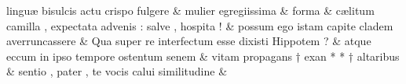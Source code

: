 \documentclass[12pt,onecolumn,twoside,a4paper]{memoir}
\begin{document}
\begin{pairs}
\begin{Leftside}
                              linguæ
                              bisulcis
                              actu
                              crispo
                              fulgere \&
                         \stanza {}mulier
                              egregiissima & 
                     forma \&
                         \stanza {}
                     cælitum
                              camilla
                              ,
                              expectata
                              advenis
                              :
                              salve
                              ,
                              hospita
                              ! \&
                         \stanza {}
                     possum
                              ego
                              istam
                              capite
                              cladem
                              averruncassere \&
                         \stanza {}
                     Qua
                              super
                              re
                              interfectum
                              esse
                              dixisti
                              Hippotem
                              ? \&
                         \stanza {}
                     atque
                              eccum
                              in
                              ipso
                              tempore
                              ostentum
                              senem \&
                         \stanza {}
                     vitam
                              propagans
                              †
                              exan * * †
                              altaribus \&
                         \stanza {}
                     sentio
                              ,
                              pater
                              ,
                              te
                              vocis
                              calui
                              similitudine \&
                         \stanza {}
                     

\end{Leftside}
\end{pairs}
\end{document}
